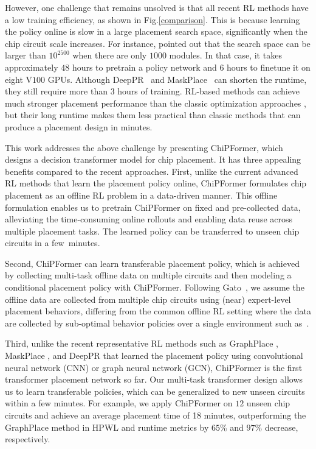 \documentclass{article}
\theoremstyle{plain}
\theoremstyle{definition}
\theoremstyle{remark}
\begin{document}
However, one challenge that remains unsolved is that all recent RL methods have a low training efficiency, as shown in Fig.\ref{comparison}. This is because learning the policy online is slow in a large placement search space, significantly when the chip circuit scale increases. 
For instance, \citet{mirhoseini2021graph} pointed out that the search space can be larger than $10^{2500}$ when there are only $1000$ modules. In that case, it takes approximately $48$ hours to pretrain a policy network and $6$ hours to finetune it on eight  V$100$ GPUs. Although DeepPR~\citep{cheng2021joint} and MaskPlace~\citep{lai2022maskplace} can shorten the runtime, they still require  more than $3$ hours of training. 
RL-based methods can achieve much stronger placement performance than the classic optimization approaches \cite{lin2020dreamplace,cheng2018replace}, but their long runtime makes them less practical than classic methods that can produce a placement design in minutes.

This work addresses the above challenge by presenting ChiPFormer, which designs a decision transformer model for chip placement. 
It has three appealing benefits compared to the recent approaches. 
First, unlike the current advanced RL methods that learn the placement policy online, ChiPFormer formulates chip placement  as an offline RL problem in a data-driven manner. 
This offline formulation enables us to pretrain ChiPFormer on fixed and pre-collected data, alleviating the time-consuming online rollouts and enabling data reuse across 
multiple placement tasks. The learned policy can be transferred to unseen chip circuits in a few~minutes.


Second, ChiPFormer can learn transferable placement policy, which is achieved by collecting {multi-task} offline data on multiple circuits and then modeling a conditional placement policy with ChiPFormer.
Following Gato~\citep{reed2022generalist}, we assume the offline data are collected from multiple chip circuits using (near) expert-level placement behaviors, differing from the common offline RL setting where the data are collected by sub-optimal behavior policies over a {single} environment such as~\citet{chen2021decision}. 

Third, unlike the recent representative RL methods such as GraphPlace \cite{mirhoseini2021graph}, MaskPlace \cite{lai2022maskplace}, and DeepPR \cite{cheng2021joint} that learned the placement policy using convolutional neural network (CNN) or graph neural network (GCN), ChiPFormer is the first transformer placement network so far. Our multi-task transformer design allows us to learn transferable policies, which can be generalized to new unseen circuits
within a few minutes. 
For example, we apply ChiPFormer on $12$ unseen chip circuits and achieve an average placement time of 18 minutes, outperforming the GraphPlace method \cite{mirhoseini2021graph} in HPWL and runtime metrics by $65$\% and $97$\% decrease, respectively.
\end{document}

